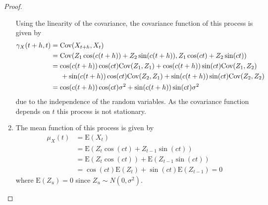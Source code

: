\documentclass[12pt]{article}
\theoremstyle{definition}
\newcommand{\E}{\text{E}}
\newcommand{\Co}[2]{\text{Cov}({#1}, {#2})}
\newcommand{\mx}[1][t]{\mu_X({#1})}
\newcommand{\gx}[2]{\gamma_X({#1}, {#2})}
\begin{document}
\begin{proof}
\begin{enumerate}
      Using the linearity of the covariance, the covariance function of this
      process is given by
      \begin{align*}
        \gx{t+h}{t} &= \Co{X_{t+h}}{X_t} \\
        &= \Co{Z_1 \cos(c(t+h))+ Z_2 \sin(c(t+h))} {Z_1 \cos(ct)+ Z_2 \sin(ct)} \\
        &= \cos(c(t+h))\cos(ct)\Co{Z_1}{Z_1} + \cos(c(t+h))\sin(ct)\Co{Z_1}{Z_2} \\
        & \hspace{5mm} + \sin(c(t+h))\cos(ct)\Co{Z_2}{Z_1} + \sin(c(t+h))\sin(ct)\Co{Z_2}{Z_2} \\
        &= \cos(c(t+h))\cos(ct) \sigma^2 + \sin(c(t+h))\sin(ct) \sigma^2
      \end{align*}
      due to the independence of the random variables. As the covariance function
      depends on $t$ this process is not stationary.
    \item The mean function of this process is given by
      \begin{align*}
        \mx &= \E(X_t) \\
        &= \E(Z_t \cos(ct)+ Z_{t-1} \sin(ct))\\
        &= \E(Z_t \cos(ct))+ \E(Z_{t-1} \sin(ct)) \\
        &= \cos(ct)\E(Z_t)+ \sin(ct)\E(Z_{t-1}) = 0
      \end{align*}
      where $\E(Z_u) = 0$ since $Z_u \sim N(0, \sigma^2)$.


\end{enumerate}
\end{proof}
\end{document}
